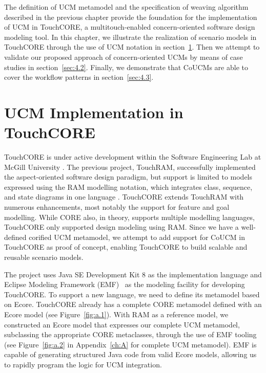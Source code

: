 The definition of UCM metamodel and the specification of weaving algorithm described in the previous chapter provide the foundation for the implementation of UCM in TouchCORE, a multitouch-enabled concern-oriented software design modeling tool. In this chapter, we illustrate the realization of scenario models in TouchCORE through the use of UCM notation in section~\ref{sec:4.1}. Then we attempt to validate our proposed approach of concern-oriented UCMs by means of case studies in section~\ref{sec:4.2}. Finally, we demonstrate that CoUCMs are able to cover the workflow patterns in section~\ref{sec:4.3}.

\section{UCM Implementation in TouchCORE} \label{sec:4.1}

TouchCORE is under active development within the Software Engineering Lab at McGill University \cite{sel2018touchcore}. The previous project, TouchRAM, successfully implemented the aspect-oriented software design paradigm, but support is limited to models expressed using the RAM modelling notation, which integrates class, sequence, and state diagrams in one language \cite{al2012touchram, schottle2014touchram}. TouchCORE extends TouchRAM with numerous enhancements, most notably the support for feature and goal modelling. While CORE also, in theory, supports multiple modelling languages, TouchCORE only supported design modeling using RAM. Since we have a well-defined corified UCM metamodel, we attempt to add support for CoUCM in TouchCORE as proof of concept, enabling TouchCORE  to build scalable and reusable scenario models.

The project uses Java SE Development Kit 8 as the implementation language and Eclipse Modeling Framework (EMF)~\cite{steinberg2008emf} as the modeling facility for developing TouchCORE. To support a new language, we need to define its metamodel based on Ecore. TouchCORE already has a complete CORE metamodel defined with an Ecore model (see Figure~\ref{fig:a.1}). With RAM as a reference model, we constructed an Ecore model that expresses our complete UCM metamodel, subclassing the appropriate CORE metaclasses, through the use of EMF tooling (see Figure~\ref{fig:a.2} in Appendix~\ref{ch:A} for complete UCM metamodel). EMF is capable of generating structured Java code from valid Ecore models, allowing us to rapidly program the logic for UCM integration.

